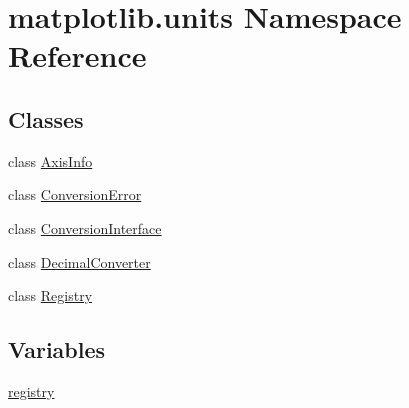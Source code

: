\hypertarget{namespacematplotlib_1_1units}{}\section{matplotlib.\+units Namespace Reference}
\label{namespacematplotlib_1_1units}
\subsection*{Classes}
\begin{DoxyCompactItemize}
\item 
class \hyperlink{classmatplotlib_1_1units_1_1AxisInfo}{Axis\+Info}
\item 
class \hyperlink{classmatplotlib_1_1units_1_1ConversionError}{Conversion\+Error}
\item 
class \hyperlink{classmatplotlib_1_1units_1_1ConversionInterface}{Conversion\+Interface}
\item 
class \hyperlink{classmatplotlib_1_1units_1_1DecimalConverter}{Decimal\+Converter}
\item 
class \hyperlink{classmatplotlib_1_1units_1_1Registry}{Registry}
\end{DoxyCompactItemize}
\subsection*{Variables}
\begin{DoxyCompactItemize}
\item 
\hyperlink{namespacematplotlib_1_1units_ab9af5252a5410c8dc4d43410dbb8ac0e}{registry}
\end{DoxyCompactItemize}


